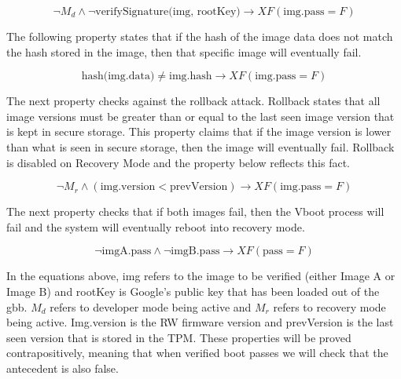 \documentclass[../report.tex]{subfiles}
\begin{document}
\begin{equation} \label{eq:sig_cor}
 \lnot M_d \land \lnot \text{verifySignature(img, rootKey)} \to XF (\text{img.pass} = F)
\end{equation}

The following property states that if the hash of the image data does not match the hash stored in the image, then that specific image will eventually fail.

\begin{equation} \label{eq:hash_cor}
    \text{hash(img.data)} \neq \text{img.hash} \to XF (\text{img.pass} = F)
\end{equation}

The next property checks against the rollback attack. 
Rollback states that all image versions must be greater than or equal to the last seen image version that is kept in secure storage. 
This property claims that if the image version is lower than what is seen in secure storage, then the image will eventually fail.
Rollback is disabled on Recovery Mode and the property below reflects this fact.

\begin{equation} \label{eq:rollback}
    \lnot M_r \land (\text{img.version} < \text{prevVersion}) \to XF (\text{img.pass} = F)
\end{equation}

The next property checks that if both images fail, then the Vboot process will fail and the system will eventually reboot into recovery mode.

\begin{equation} \label{eq:both-fail}
    \lnot \text{imgA.pass} \land \lnot \text{imgB.pass} \to XF (\text{pass} = F)
\end{equation}



In the equations above, img refers to the image to be verified (either Image A or Image B)  and rootKey is Google's public key that has been loaded out of the gbb.
$M_d$ refers to developer mode being active and $M_r$ refers to recovery mode being active.
Img.version is the RW firmware version and prevVersion is the last seen version that is stored in the TPM\@.
These properties will be proved contrapositively, meaning that when verified boot passes we will check that the antecedent is also false.
\end{document}
